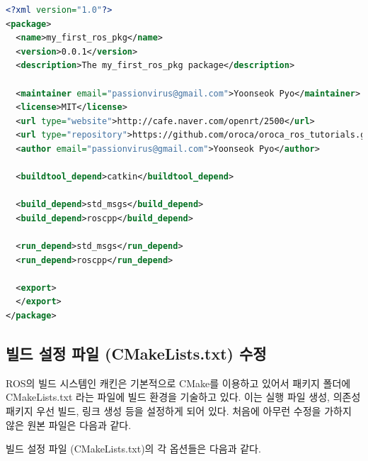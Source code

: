 \begin{lstlisting}[language=XML]
<?xml version="1.0"?>
<package>
  <name>my_first_ros_pkg</name>
  <version>0.0.1</version>
  <description>The my_first_ros_pkg package</description>
 
  <maintainer email="passionvirus@gmail.com">Yoonseok Pyo</maintainer>
  <license>MIT</license>
  <url type="website">http://cafe.naver.com/openrt/2500</url>
  <url type="repository">https://github.com/oroca/oroca_ros_tutorials.git</url>
  <author email="passionvirus@gmail.com">Yoonseok Pyo</author>
 
  <buildtool_depend>catkin</buildtool_depend>
 
  <build_depend>std_msgs</build_depend>
  <build_depend>roscpp</build_depend>
 
  <run_depend>std_msgs</run_depend>
  <run_depend>roscpp</run_depend>
 
  <export>
  </export>
</package>
\end{lstlisting}

\subsection{빌드 설정 파일 (CMakeLists.txt) 수정}

ROS의 빌드 시스템인 캐킨은 기본적으로 CMake를 이용하고 있어서 패키지 폴더에 CMakeLists.txt 라는 파일에 빌드 환경을 기술하고 있다. 이는 실행 파일 생성, 의존성 패키지 우선 빌드, 링크 생성 등을 설정하게 되어 있다. 처음에 아무런 수정을 가하지 않은 원본 파일은 다음과 같다.



\noindent
빌드 설정 파일 (CMakeLists.txt)의 각 옵션들은 다음과 같다.

